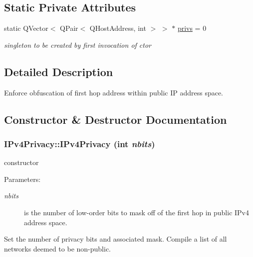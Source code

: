 \subsection*{Static Private Attributes}
\begin{CompactItemize}
\item 
\hypertarget{classIPv4Privacy_0244add050af304dcc2b33266b8a592e}{
static QVector$<$ QPair$<$ QHostAddress, int $>$ $>$ $\ast$ \hyperlink{classIPv4Privacy_0244add050af304dcc2b33266b8a592e}{privs} = 0}
\label{classIPv4Privacy_0244add050af304dcc2b33266b8a592e}

\begin{CompactList}\small\item\em singleton to be created by first invocation of ctor \item\end{CompactList}\end{CompactItemize}


\subsection{Detailed Description}
Enforce obfuscation of first hop address within public IP address space. 

\subsection{Constructor \& Destructor Documentation}
\hypertarget{classIPv4Privacy_1527628365ad50b068b9fa27159b7ce6}{
\subsubsection[IPv4Privacy]{\setlength{\rightskip}{0pt plus 5cm}IPv4Privacy::IPv4Privacy (int {\em nbits})}}
\label{classIPv4Privacy_1527628365ad50b068b9fa27159b7ce6}


constructor \begin{Desc}
\item[Parameters:]
\begin{description}
\item[{\em nbits}]is the number of low-order bits to mask off of the first hop in public IPv4 address space.\end{description}
\end{Desc}
Set the number of privacy bits and associated mask. Compile a list of all networks deemed to be non-public. 

